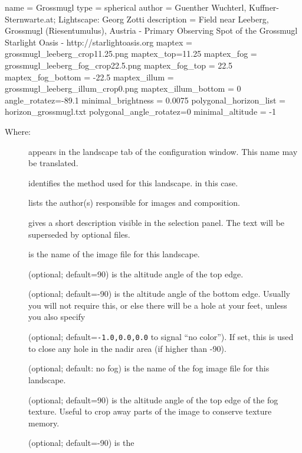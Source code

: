 \begin{configfile}
[landscape]
name = Grossmugl
type = spherical
author = Guenther Wuchterl, Kuffner-Sternwarte.at;
         Lightscape: Georg Zotti
description = Field near Leeberg, Grossmugl (Riesentumulus),
              Austria - Primary Observing Spot of the Grossmugl
              Starlight Oasis - http://starlightoasis.org
maptex = grossmugl_leeberg_crop11.25.png
maptex_top=11.25
maptex_fog = grossmugl_leeberg_fog_crop22.5.png
maptex_fog_top = 22.5
maptex_fog_bottom = -22.5
maptex_illum = grossmugl_leeberg_illum_crop0.png
maptex_illum_bottom = 0
angle_rotatez=-89.1
minimal_brightness = 0.0075
polygonal_horizon_list = horizon_grossmugl.txt
polygonal_angle_rotatez=0
minimal_altitude = -1
\end{configfile}
Where:
\begin{description}
\item[] appears in the landscape tab of the configuration window. This name may be translated.
\item[] identifies the method used for this
  landscape.  in this case.
\item[] lists the author(s) responsible for images and
  composition.
\item[] gives a short description visible in the
  selection panel. The text will be superseded by optional
   files.
\item[] is the name of the image file for this landscape.
\item[] (optional; default=90) is the altitude angle
  of the top edge.
\item[] (optional; default=-90) is the altitude
  angle of the bottom edge. Usually you will not require this, or else
  there will be a hole at your feet, unless you also specify
\item[] (optional;
  default=\texttt{-1.0,0.0,0.0} to signal ``no color''). If set, this
  is used to close any hole in the nadir area (if 
  higher than -90). 
\item[] (optional; default: no fog) is the name of
  the fog image file for this landscape.
\item[] (optional; default=90) is the altitude
  angle of the top edge of the fog texture. Useful to crop away parts
  of the image to conserve texture memory.
\item[] (optional; default=-90) is the

\end{description}
